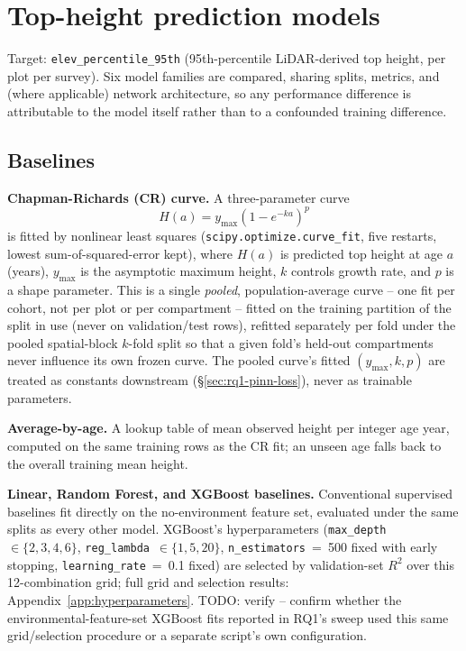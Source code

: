 \documentclass[11pt,a4paper]{report}
\begin{document}
\section{Top-height prediction models}
\label{sec:rq1}
\label{sec:rq1-pinn}

Target: \texttt{elev\_percentile\_95th} (95th-percentile LiDAR-derived top height, per plot per
survey). Six model families are compared, sharing splits, metrics, and (where applicable) network
architecture, so any performance difference is attributable to the model itself rather than to a
confounded training difference.

\subsection{Baselines}

\textbf{Chapman-Richards (CR) curve.} A three-parameter curve
\begin{equation}
H(a) = y_{\max}\left(1-e^{-ka}\right)^{p}
\label{eq:cr}
\end{equation}
is fitted by nonlinear least squares (\texttt{scipy.optimize.curve\_fit}, five restarts, lowest
sum-of-squared-error kept), where $H(a)$ is predicted top height at age $a$ (years), $y_{\max}$ is
the asymptotic maximum height, $k$ controls growth rate, and $p$ is a shape parameter. This is a
single \emph{pooled}, population-average curve -- one fit per cohort, not per plot or per
compartment -- fitted on the training partition of the split in use (never on validation/test
rows), refitted separately per fold under the pooled spatial-block $k$-fold split so that a given
fold's held-out compartments never influence its own frozen curve. The pooled curve's fitted
$(y_{\max},k,p)$ are treated as constants downstream (\S\ref{sec:rq1-pinn-loss}), never as
trainable parameters.

\textbf{Average-by-age.} A lookup table of mean observed height per integer age year, computed on
the same training rows as the CR fit; an unseen age falls back to the overall training mean
height.

\textbf{Linear, Random Forest, and XGBoost baselines.} Conventional supervised baselines fit
directly on the no-environment feature set, evaluated under the same splits as every other model.
XGBoost's hyperparameters (\texttt{max\_depth}~$\in\{2,3,4,6\}$,
\texttt{reg\_lambda}~$\in\{1,5,20\}$, \texttt{n\_estimators}~=~500 fixed with early stopping,
\texttt{learning\_rate}~=~0.1 fixed) are selected by validation-set $R^2$ over this 12-combination
grid; full grid and selection results: Appendix~\ref{app:hyperparameters}. %
TODO: verify -- confirm whether the environmental-feature-set XGBoost fits reported in RQ1's
sweep used this same grid/selection procedure or a separate script's own configuration.
\end{document}
